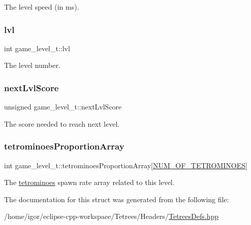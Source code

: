 The level speed (in ms). \mbox{\label{structgame__level__t_ab80383a9c51e3ad25cda4df0a7df8df2}} 
\subsubsection{\texorpdfstring{lvl}{lvl}}
{\footnotesize\ttfamily int game\+\_\+level\+\_\+t\+::lvl}

The level number. \mbox{\label{structgame__level__t_a9f5f86c9c90bebdd20950d74bf2dd450}} 
\subsubsection{\texorpdfstring{next\+Lvl\+Score}{nextLvlScore}}
{\footnotesize\ttfamily unsigned game\+\_\+level\+\_\+t\+::next\+Lvl\+Score}

The score needed to reach next level. \mbox{\label{structgame__level__t_abcef20ad8f4df7d270a4d5111ac8d85a}} 
\subsubsection{\texorpdfstring{tetrominoes\+Proportion\+Array}{tetrominoesProportionArray}}
{\footnotesize\ttfamily int game\+\_\+level\+\_\+t\+::tetrominoes\+Proportion\+Array\mbox{[}\hyperlink{TetreesDefs_8hpp_a69fa4aa1afe74f7f9ec42bf1e07ddf28}{N\+U\+M\+\_\+\+O\+F\+\_\+\+T\+E\+T\+R\+O\+M\+I\+N\+O\+ES}\mbox{]}}

The \hyperlink{TetreesDefs_8hpp_adf4f8e2cbbd7d8894fe3beda39db1b8f}{tetrominoes} spawn rate array related to this level. 

The documentation for this struct was generated from the following file\+:\begin{DoxyCompactItemize}
\item 
/home/igor/eclipse-\/cpp-\/workspace/\+Tetrees/\+Headers/\hyperlink{TetreesDefs_8hpp}{Tetrees\+Defs.\+hpp}\end{DoxyCompactItemize}
